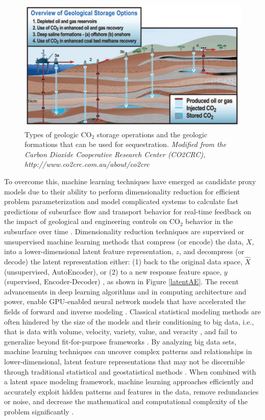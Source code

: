 \documentclass[10pt, twoside]{article}
\begin{document}
\begin{figure}
    \centering
    \includegraphics[width=15cm]{figures/co2types.png}
    \caption{Types of geologic CO$_2$ storage operations and the geologic formations that can be used for sequestration. \textit{Modified from the Carbon Dioxide Cooperative Research Center (CO2CRC), http://www.co2crc.com.au/about/co2crc}}
    \label{co2types}
\end{figure}

To overcome this, machine learning techniques have emerged as candidate proxy models due to their ability to perform dimensionality reduction for efficient problem parameterization and model complicated systems to calculate fast predictions of subsurface flow and transport behavior for real-time feedback on the impact of geological and engineering controls on CO$_2$ behavior in the subsurface over time \cite{10.30632/SPWLA-2023-0084, Wu2021, Misra2022}. Dimensionality reduction techniques are supervised or unsupervised machine learning methods that compress (or encode) the data, $X$, into a lower-dimensional latent feature representation, $z$, and decompress (or decode) the latent representation either: (1) back to the original data space, $\hat{X}$ (unsupervised, AutoEncoder), or (2) to a new response feature space, $y$ (supervised, Encoder-Decoder) \cite{mabadeje2023rigid, Liu2022, Canchumuni201987}, as shown in Figure \ref{latentAE}. The recent advancements in deep learning algorithms and in computing architecture and power, enable GPU-enabled neural network models that have accelerated the fields of forward and inverse modeling \cite{Zhang20111631, Yan2022}. Classical statistical modeling methods are often hindered by the size of the models and their conditioning to big data, i.e., that is data with volume, velocity, variety, value, and veracity \cite{tariq2021systematic, MIRZA202227}, and fail to generalize beyond fit-for-purpose frameworks \cite{chiles2012geostatistics, pyrcz2014geostatistical}. By analyzing big data sets, machine learning techniques can uncover complex patterns and relationships in lower-dimensional, latent feature representations that may not be discernible through traditional statistical and geostatistical methods \cite{Brunton2016SparseNLDynamics, FriesChoi2022LaSDI, HeChoi2023gLaSDI}. When combined with a latent space modeling framework, machine learning approaches efficiently and accurately exploit hidden patterns and features in the data, remove redundancies or noise, and decrease the mathematical and computational complexity of the problem significantly \cite{Liu2020M15, Razak2022}. 
\end{document}
